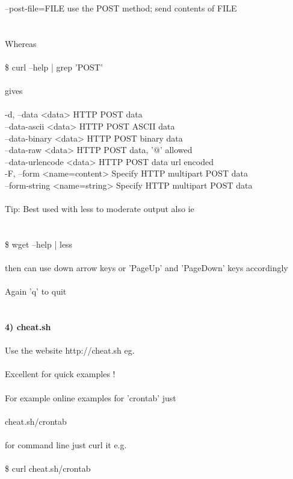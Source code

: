 \documentclass[10pt,a4paper]{article}
\begin{document}
       --post-file=FILE            use the POST method; send contents of FILE\\
\\
\\
Whereas\\
\\
\$ curl --help | grep 'POST'\\
\\
gives\\
\\
 -d, --data <data>   HTTP POST data\\
     --data-ascii <data> HTTP POST ASCII data\\
     --data-binary <data> HTTP POST binary data\\
     --data-raw <data> HTTP POST data, '@' allowed\\
     --data-urlencode <data> HTTP POST data url encoded\\
 -F, --form <name=content> Specify HTTP multipart POST data\\
     --form-string <name=string> Specify HTTP multipart POST data\\
\\
Tip: Best used with less to moderate output also ie  \\
\\
\\
\$ wget --help | less\\
\\
then can use down arrow keys or 'PageUp' and 'PageDown' keys accordingly\\
\\
Again 'q' to quit\\
\\
\\
\textbf{{\large 4) cheat.sh}}\\
\\
Use the website http://cheat.sh  eg.\\
\\
Excellent for quick examples !\\
\\
For example online examples for 'crontab' just\\
\\
cheat.sh/crontab\\
\\
for command line just curl it e.g.\\
\\
\$ curl cheat.sh/crontab\\
\\
\end{document}
